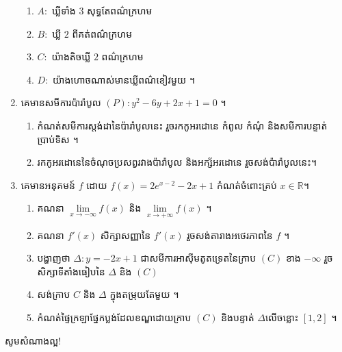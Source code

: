 \documentclass[a4paper, 11pt]{exam}
\begin{document}
\begin{enumerate}[I]
	\begin{enumerate}[a]
		\item $A:$ ឃ្លីទាំង $3$ សុទ្ធតែពណ៌ក្រហម
		\item $B:$ ឃ្លី $2$ ពីគត់ពណ៌ក្រហម 
		\item $C:$ យ៉ាងតិចឃ្លី $2$ ពណ៌ក្រហម
		\item $D:$ យ៉ាងហោចណាស់មានឃ្លីពណ៌ខៀវមួយ ។ 
	\end{enumerate}
	\item គេមានសមីការប៉ារ៉ាបូល $(P): y^2-6y+2x+1=0$ ។
	\begin{enumerate}[a]
		\item កំណត់សមីការស្តង់ដានៃប៉ារ៉ាបូលនេះ រួចរកកូអរដោនេ កំពូល កំណុំ និងសមីការបន្ទាត់ប្រាប់ទិស ។
		\item រកកូអរដោនេនៃចំណុចប្រសព្វរវាងប៉ារ៉ាបូល និងអក្ស័អរដោនេ រួចសង់ប៉ារ៉ាបូលនេះ​ ។ 
	\end{enumerate}
	\item គេមានអនុគមន៍ $f$ ដោយ $f(x) = 2e^{x-2}-2x+1$ កំណត់ចំពោះគ្រប់ $x\in\mathbb{R}$​។
	\begin{enumerate}[a]
		\item គណនា $\lim\limits_{x\to-\infty} f(x)$ និង $\lim\limits_{x\to+\infty} f(x)$ ។
		\item គណនា $f'(x)$ សិក្សាសញ្ញានៃ $f'(x)$ រួចសង់តារាងអថេរភាពនៃ $f$ ។
		\item បង្ហាញថា $\Delta:​y=-2x+1$ ជាសមីការអាស៊ីមតូតទ្រេតនៃក្រាប $(C)$ ខាង $-\infty$ រួចសិក្សាទីតាំងធៀបនៃ $\Delta$ និង $(C)$
		\item សង់ក្រាប $C$ និង $\Delta$ ក្នុងតម្រុយតែមួយ ។
		\item កំណត់ផ្ទៃក្រឡាផ្នែកប្លង់ដែលខណ្ឌដោយក្រាប $(C)$ និងបន្ទាត់ $\Delta$​លើចន្លោះ $[1,2]$ ។
	\end{enumerate}
\end{enumerate}
\begin{center}
	\sffamily\color{black}
	សូមសំណាងល្អ!
\end{center}\newpage
\end{document}
